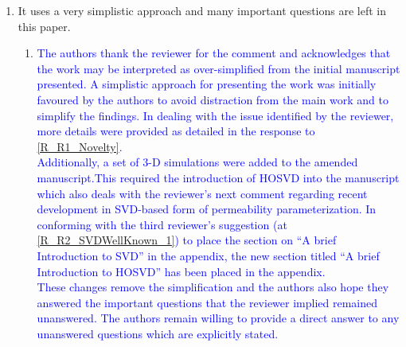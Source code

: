 \documentclass[11pt]{letter} %
\newcommand{\blue}{\textcolor{blue}}
\begin{document}
\begin{letter}
{\begin{enumerate}
\begin{enumerate}
      \begin{center}
        \blue{A Reduced Order Model for Permeability Fields Using Singular Value Decomposition (SVD)}
        \end{center}
      \blue{\bf{Manuscript Title after Amendment:}}
      \begin{center}
        \blue{A Reduced Order Model for Porous Media Flows which Couples Linear Regression with Principal Component Analysis (PCA) using Singular Value Decomposition (SVD) or Higer Order Singular Value Decomposition (HOSVD): Upscaling the Permeability Field for Multiphase Reservoir Flow Simulation}
      \end{center}
      \blue{\bf{Manuscript body before Amendment:}}\\
      \\
      \\
      \blue{\bf{Manuscript body after Amendment:}}\\
      \\
      \\
    \item \label{R_R1_OverSimplification} It uses a very simplistic approach and many important questions are left in this paper.
      \begin{enumerate}
      \item \label{R_R1_OverSimplification_P1} \blue{The authors thank the reviewer for the comment and acknowledges that the work may be interpreted as over-simplified from the initial manuscript presented. A simplistic approach for presenting the work was initially favoured by the authors to avoid distraction from the main work and to simplify the findings. In dealing with the issue identified by the reviewer, more details were provided as detailed in the response to \ref{R_R1_Novelty}.\\
        Additionally, a set of 3-D simulations were added to the amended manuscript.This required the introduction of HOSVD into the manuscript which also deals with the reviewer's next comment regarding recent development in SVD-based form of permeability parameterization. In conforming with the third reviewer's suggestion (at \ref{R_R2_SVDWellKnown_1}) to place the section on ``A brief Introduction to SVD'' in the appendix, the new section titled ``A brief Introduction to HOSVD'' has been placed in the appendix. \\
        These changes remove the simplification and the authors also hope they answered the important questions that the reviewer implied remained unanswered. The authors remain willing to provide a direct answer to any unanswered questions which are explicitly stated.}

\end{enumerate}
\end{enumerate}
\end{enumerate}}
\end{letter}
\end{document}
